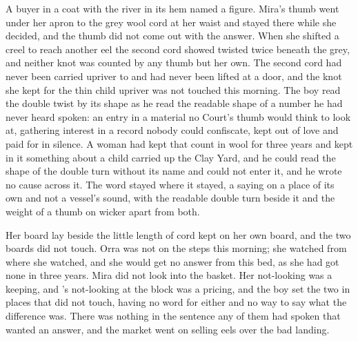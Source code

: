 A buyer in a coat with the river in its hem named a figure. Mira's thumb went under her apron to the grey wool cord at her waist and stayed there while she decided, and the thumb did not come out with the answer. When she shifted a creel to reach another eel the second cord showed twisted twice beneath the grey, and neither knot was counted by any thumb but her own. The second cord had never been carried upriver to  and had never been lifted at a door, and the knot she kept for the thin child upriver was not touched this morning. The boy read the double twist by its shape as he read the readable shape of a number he had never heard spoken: an entry in a material no Court's thumb would think to look at, gathering interest in a record nobody could confiscate, kept out of love and paid for in silence. A woman had kept that count in wool for three years and kept in it something about a child carried up the Clay Yard, and he could read the shape of the double turn without its name and could not enter it, and he wrote no cause across it. The word stayed where it stayed, a saying on a place of its own and not a vessel's sound, with the readable double turn beside it and the weight of a thumb on wicker apart from both.

Her board lay beside the little length of cord  kept on her own board, and the two boards did not touch. Orra was not on the steps this morning; she watched from where she watched, and she would get no answer from this bed, as she had got none in three years. Mira did not look into the basket. Her not-looking was a keeping, and 's not-looking at the block was a pricing, and the boy set the two in places that did not touch, having no  word for either and no way to say what the difference was. There was nothing in the sentence any of them had spoken that wanted an answer, and the market went on selling eels over the bad landing.

\scenebreak

